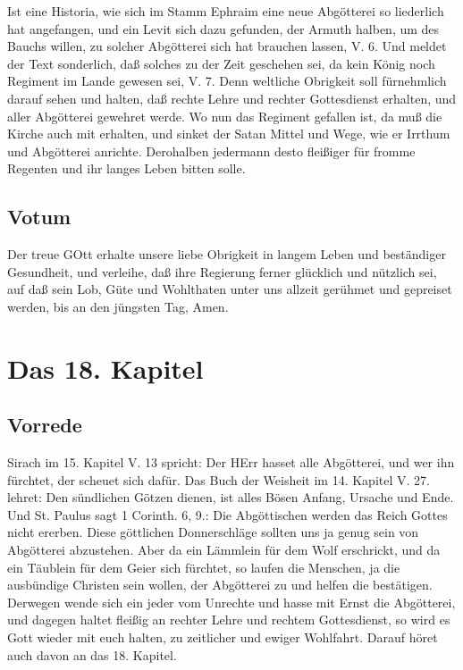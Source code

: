 Ist eine Historia, wie sich im Stamm Ephraim eine neue Abgötterei so liederlich hat angefangen, und ein Levit sich dazu gefunden, der Armuth halben, um des Bauchs willen, zu solcher Abgötterei sich hat brauchen lassen, V. 6. Und meldet der Text sonderlich, daß solches zu der Zeit geschehen sei, da kein König noch Regiment im Lande gewesen sei, V. 7. Denn weltliche Obrigkeit soll fürnehmlich darauf sehen und halten, daß rechte Lehre und rechter Gottesdienst erhalten, und aller Abgötterei gewehret werde. Wo nun das Regiment gefallen ist, da muß die Kirche auch mit erhalten, und sinket der Satan Mittel und Wege, wie er Irrthum und Abgötterei anrichte. Derohalben jedermann desto fleißiger für fromme Regenten und ihr langes Leben bitten solle.

\section{Votum}

Der treue GOtt erhalte unsere liebe Obrigkeit in langem Leben und beständiger Gesundheit, und verleihe, daß ihre Regierung ferner glücklich und nützlich sei, auf daß sein Lob, Güte und Wohlthaten unter uns allzeit gerühmet und gepreiset werden, bis an den jüngsten Tag, Amen.

\chapter{Das 18. Kapitel}

\section{Vorrede}

Sirach im 15. Kapitel V. 13 spricht: Der HErr hasset alle Abgötterei, und wer ihn fürchtet, der scheuet sich dafür. Das Buch der Weisheit im 14. Kapitel V. 27. lehret: Den sündlichen Götzen dienen, ist alles Bösen Anfang, Ursache und Ende. Und St. Paulus sagt 1 Corinth. 6, 9.: Die Abgöttischen werden das Reich Gottes nicht ererben. Diese göttlichen Donnerschläge sollten uns ja genug sein von Abgötterei abzustehen. Aber da ein Lämmlein für dem Wolf erschrickt, und da ein Täublein für dem Geier sich fürchtet, so laufen die Menschen, ja die ausbündige Christen sein wollen, der Abgötterei zu und helfen die bestätigen. Derwegen wende sich ein jeder vom Unrechte und hasse mit Ernst die Abgötterei, und dagegen haltet fleißig an rechter Lehre und rechtem Gottesdienst, so wird es Gott wieder mit euch halten, zu zeitlicher und ewiger Wohlfahrt. Darauf höret auch davon an das 18. Kapitel.

